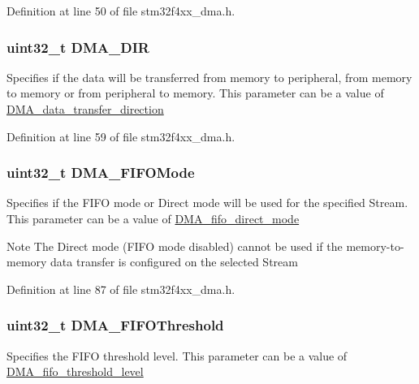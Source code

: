 Definition at line 50 of file stm32f4xx\-\_\-dma.\-h.

\hypertarget{struct_d_m_a___init_type_def_a4cf4283185065f65d5a63089877cbb8d}{
\subsubsection[{D\-M\-A\-\_\-\-D\-I\-R}]{\setlength{\rightskip}{0pt plus 5cm}uint32\-\_\-t D\-M\-A\-\_\-\-D\-I\-R}}\label{struct_d_m_a___init_type_def_a4cf4283185065f65d5a63089877cbb8d}
Specifies if the data will be transferred from memory to peripheral, from memory to memory or from peripheral to memory. This parameter can be a value of \hyperlink{group___d_m_a__data__transfer__direction}{D\-M\-A\-\_\-data\-\_\-transfer\-\_\-direction} 

Definition at line 59 of file stm32f4xx\-\_\-dma.\-h.

\hypertarget{struct_d_m_a___init_type_def_a684555f9f5644259b7c4ca446b6dcf8f}{
\subsubsection[{D\-M\-A\-\_\-\-F\-I\-F\-O\-Mode}]{\setlength{\rightskip}{0pt plus 5cm}uint32\-\_\-t D\-M\-A\-\_\-\-F\-I\-F\-O\-Mode}}\label{struct_d_m_a___init_type_def_a684555f9f5644259b7c4ca446b6dcf8f}
Specifies if the F\-I\-F\-O mode or Direct mode will be used for the specified Stream. This parameter can be a value of \hyperlink{group___d_m_a__fifo__direct__mode}{D\-M\-A\-\_\-fifo\-\_\-direct\-\_\-mode} \begin{DoxyNote}{Note}
The Direct mode (F\-I\-F\-O mode disabled) cannot be used if the memory-\/to-\/memory data transfer is configured on the selected Stream 
\end{DoxyNote}


Definition at line 87 of file stm32f4xx\-\_\-dma.\-h.

\hypertarget{struct_d_m_a___init_type_def_a2bbb3ea272279aa5cddef702e153a09d}{
\subsubsection[{D\-M\-A\-\_\-\-F\-I\-F\-O\-Threshold}]{\setlength{\rightskip}{0pt plus 5cm}uint32\-\_\-t D\-M\-A\-\_\-\-F\-I\-F\-O\-Threshold}}\label{struct_d_m_a___init_type_def_a2bbb3ea272279aa5cddef702e153a09d}
Specifies the F\-I\-F\-O threshold level. This parameter can be a value of \hyperlink{group___d_m_a__fifo__threshold__level}{D\-M\-A\-\_\-fifo\-\_\-threshold\-\_\-level} 

